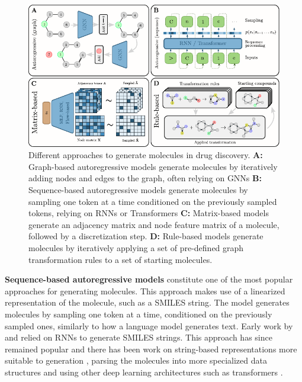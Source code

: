 \begin{figure}[t]
    \centering
    \includegraphics[width=\textwidth]{figures/generation_strategies.pdf}
    \caption{Different approaches to generate molecules in drug discovery. \textbf{A:} Graph-based
        autoregressive models generate molecules by iteratively adding nodes and edges to the graph,
        often relying on \acp{GNN} \textbf{B:} Sequence-based autoregressive models generate
        molecules by sampling one token at a time conditioned on the previously sampled tokens,
        relying on \acp{RNN} or Transformers \textbf{C:} Matrix-based models generate an adjacency
        matrix and node feature matrix of a molecule, followed by a discretization step. \textbf{D:}
        Rule-based models generate molecules by iteratively applying a set of pre-defined graph
        transformation rules to a set of starting molecules. \label{fig:generation-strategies}}
\end{figure}
\textbf{Sequence-based autoregressive models} constitute one of the most popular approaches for
generating molecules. This approach makes use of a linearized representation of the molecule, such
as a SMILES string. The model generates molecules by sampling one token at a time,
conditioned on the previously sampled ones, similarly to how a language model generates text.
Early work by \citep{seglerGeneratingFocusedMolecule2018} and
\citep{gomez-bombarelliAutomaticChemicalDesign2018} relied on \acp{RNN} to
generate SMILES strings. This approach has since remained popular and there has been work on
string-based representations more suitable to generation
\citep{oboyleDeepSMILESAdaptationSMILES2018,krennSelfreferencingEmbeddedStrings2020a,noutahiGottaBeSAFE2024},
parsing the molecules into more specialized data structures
\citep{kusnerGrammarVariationalAutoencoder2017,jinJunctionTreeVariational2018} and using other deep
learning architectures such as transformers
\citep{vaswaniAttentionAllYou2017,noutahiGottaBeSAFE2024,schwallerMolecularTransformerModel2019,bagalMolGPTMolecularGeneration2022,mazuzMoleculeGenerationUsing2023}.

